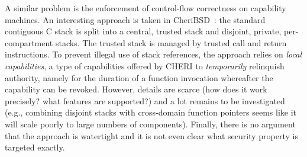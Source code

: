 \documentclass[format=acmsmall, review=true, screen=true]{acmart}
\begin{document}
A similar problem is the enforcement of control-flow correctness on capability machines.
An interesting approach is taken in CheriBSD~\citep{Watson2015Cheri}: the standard contiguous C stack is split into a central, trusted stack and disjoint, private, per-compartment stacks.
The trusted stack is managed by trusted call and return instructions.
To prevent illegal use of stack references, the approach relies on \emph{local capabilities}, a type of capabilities offered by CHERI to \emph{temporarily} relinquish authority, namely for the duration of a function invocation whereafter the capability can be revoked.
However, details are scarce (how does it work precisely?
what features are supported?)
and a lot remains to be investigated (e.g., combining disjoint stacks with cross-domain function pointers seems like it will scale poorly to large numbers of components).
Finally, there is no argument that the approach is watertight and it is not even clear what security property is targeted exactly.
\end{document}
